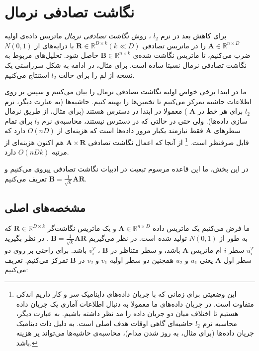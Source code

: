 \section{
نگاشت تصادفی نرمال
\label{SecNormal}
}
برای کاهش بعد در نرم 
$l_2$
، روش 
\textit{
نگاشت تصادفی نرمال
}
ماتریس داده‌ی اولیه 
$\mathbf{A} \in \mathbb{R}^{n \times D}$
را در ماتریس تصادفی 
$\mathbf{R} \in \mathbb{R}^{D \times k} (k \ll D)$
با درایه‌های 
از 
$N(0,1)$
ضرب می‌کنیم، تا ماتریس نگاشت شده‌ی 
$\mathbf{B} \in \mathbb{R}^{n \times k}$
حاصل شود. تحلیل‌های مربوط به نگاشت تصادفی نرمال نسبتا ساده است. برای مثال، در ادامه به شکل سرراستی یک نسخه از لم 
%
\cite{litez103}
را برای حالت 
$l_2$
استنتاج می‌کنیم.

ما در ابتدا برخی خواص اولیه نگاشت تصادفی نرمال را بیان می‌کنیم و سپس بر روی اطلاعات حاشیه تمرکز می‌کنیم تا تخمین‌ها را بهینه کنیم. حاشیه‌ها (به عبارت دیگر، نرم 
$l_2$
برای هر خط در 
$\mathbf{A}$
)
معمولا در ابتدا در دسترس هستند (برای مثال، از طریق نرمال سازی داده‌ها). ولی حتی در حالتی که در دسترس نیستند، محاسبه‌ی نرم 
$l_2$
برای تمام سطرهای 
$\mathbf{A}$
فقط نیازمند یکبار مرور داده‌ها است که هزینه‌ای از 
$O(nD)$
دارد که قابل صرفنظر است.
\footnote{
این وضعیتی برای زمانی که با جریان داده‌های داینامیک سر و کار داریم اندکی متفاوت است. در جریان‌ داد‌ه‌های ما معمولا به دنبال اطلاعات آماری یک جریان داده هستیم تا اختلاف میان دو جریان داده را مد نظر داشته باشیم. به عبارت دیگر، محاسبه نرم 
$l_2$
حاشیه‌ای گاهی اوقات هدف اصلی است. به دلیل ذات دینامیک جریان‌ داده‌ها (برای مثال، به روز شدن مدام)، محاسبه‌ی حاشیه‌ها می‌تواند پر هزینه باشد.
}
از آنجا که اعمال نگاشت تصادفی 
$\mathbf{A} \times \mathbf{R}$
هم اکنون هزینه‌ای از مرتبه 
$O(nDk)$
دارد.

در این بخش، ما این قاعده مرسوم تبعیت در ادبیات نگاشت تصادفی 
\cite{litez166}
پیروی می‌کنیم و تعریف می‌کنیم
$\mathbf{B} = \frac{1}{\sqrt{k}} \mathbf{A} \mathbf{R}$.

\subsection{
مشخصه‌های اصلی
}

ما فرض می‌کنیم یک ماتریس داده 
$\mathbf{A} \in \mathbb{R}^{n \times D}$
و یک ماتریس نگاشت‌گر
$\mathbf{R} \in \mathbb{R}^{D \times k}$
که به طور 
از 
$N(0,1)$
تولید شده است. در نظر می‌گیریم
$\mathbf{B} = \frac{1}{\sqrt{k}} \mathbf{A} \mathbf{R}$
.
در نظر بگیرید
$u_i^T$
سطر
$i$
ام ماتریس 
$\mathbf{A}$
باشد، و سطر متناظر در 
$\mathbf{B}$
،
$v_i^T$
باشد.
برای راحتی بر روی دو سطر اول 
$\mathbf{A}$
یعنی 
$u_1$
و
$u_2$
همچنین دو سطر اولیه
$v_1$
و 
$v_2$
در 
$\mathbf{B}$
تمرکز می‌کنیم. تعریف می‌کنیم:

